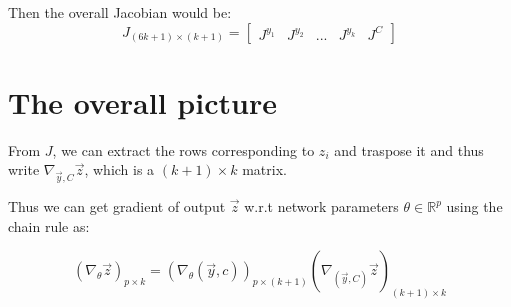 \documentclass[11 pt]{article}
\begin{document}
Then the overall Jacobian would be:
\[J_{(6k+1)\times (k+1)} = \begin{bmatrix}J^{y_1}&J^{y_2}&...&J^{y_k}&J^C\end{bmatrix}\]


\section{The overall picture}

From $J$, we can extract the rows corresponding to $z_i$ and traspose it and thus write $\nabla_{\vec{y},C}{\vec{z}}$, which is a $(k+1) \times k$ matrix.

Thus we can get gradient of output $\vec{z}$ w.r.t network parameters $\theta \in \mathbb{R}^p$ using the chain rule as:

\[(\nabla_{\theta}\vec{z})_{p \times k} = (\nabla_{\theta}(\vec{y},c))_{p \times (k+1)} (\nabla_{(\vec{y},C)}\vec{z})_{(k+1) \times k}\]
\end{document}
